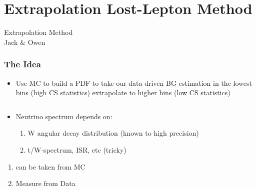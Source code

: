\documentclass{beamer}
\begin{document}
\section{Extrapolation Lost-Lepton Method}
\begin{frame}
 \begin{block}{}
 \centering
 \Large \MHT Extrapolation Method\\  \small Jack \& Owen
 \end{block}
\end{frame}

\begin{frame}
 \frametitle{The Idea}
 \begin{itemize}
  \item Use MC to build a \MHT PDF to take our data-driven BG estimation in the lowest \MHT bins (high CS statistics) extrapolate to higher \MHT bins (low CS statistics)
 \end{itemize}
  \begin{columns}
  \begin{column}{0.45\textwidth}
   \begin{itemize}
    \item Neutrino spectrum depends on:
    \begin{enumerate}
     \item W angular decay distribution (known to high precision)
     \item t/W-\pt spectrum, ISR, etc (tricky)
    \end{enumerate}
    \end{itemize}
    \begin{enumerate}
     \item can be taken from MC 
     \item Measure from Data
    \end{enumerate}
  \end{column}
  \begin{column}{0.55\textwidth}
\end{column}
\end{columns}
\end{frame}
\end{document}

